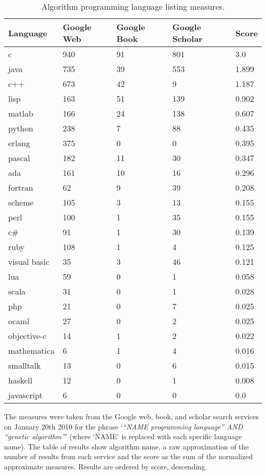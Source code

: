 \documentclass[a4paper, 11pt]{article}
\begin{document}
\begin{table}[htp]
	\centering
		\begin{tabularx}{\textwidth}{lXXXX}
		\toprule
		\textbf{Language} & \textbf{Google Web} & \textbf{Google Book} & \textbf{Google Scholar} & \textbf{Score} \\ 
		\toprule
		c & 940 & 91 & 801 & 3.0 \\
		java & 735 & 39 & 553 & 1.899 \\
		c++ & 673 & 42 & 9 & 1.187 \\
		lisp & 163 & 51 & 139 & 0.902 \\
		matlab & 166 & 24 & 138 & 0.607 \\
		python & 238 & 7 & 88 & 0.435 \\
		erlang & 375 & 0 & 0 & 0.395 \\
		pascal & 182 & 11 & 30 & 0.347 \\
		ada & 161 & 10 & 16 & 0.296 \\
		fortran & 62 & 9 & 39 & 0.208 \\
		scheme & 105 & 3 & 13 & 0.155 \\
		perl & 100 & 1 & 35 & 0.155 \\
		c\# & 91 & 1 & 30 & 0.139 \\
		ruby & 108 & 1 & 4 & 0.125 \\
		visual basic & 35 & 3 & 46 & 0.121 \\
		lua & 59 & 0 & 1 & 0.058 \\
		scala & 31 & 0 & 1 & 0.028 \\
		php & 21 & 0 & 7 & 0.025 \\
		ocaml & 27 & 0 & 2 & 0.025 \\
		objective-c & 14 & 1 & 2 & 0.022 \\
		mathematica & 6 & 1 & 4 & 0.016 \\
		smalltalk & 13 & 0 & 6 & 0.015 \\
		haskell & 12 & 0 & 1 & 0.008 \\
		javascript & 6 & 0 & 0 & 0.0 \\
		\bottomrule
		\end{tabularx}	
	\caption{Algorithm programming language listing measures.}
	\label{tab:results}
\end{table}

The measures were taken from the Google web, book, and scholar search services on January 20th 2010 for the phrase `\emph{``NAME programming language'' AND ``genetic algorithm''}' (where `NAME' is replaced with each specific language name). The table of results show algorithm name, a raw approximation of the number of results from each service and the score as the sum of the normalized approximate measures. Results are ordered by score, descending.
\end{document}

